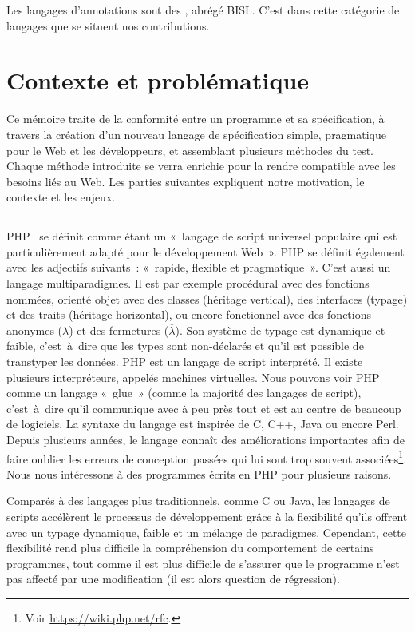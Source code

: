 Les langages d'annotations sont des , abré\-gé BISL. C'est dans cette catégorie de langages
que se situent nos contributions.

\section{Contexte et problématique}

Ce mémoire traite de la conformité entre un programme et sa spécification, à
travers la création d'un nouveau langage de spécification simple, pragmatique
pour le Web et les développeurs, et assemblant plusieurs méthodes du test.
Chaque méthode introduite se verra enrichie pour la rendre compatible avec les
besoins liés au Web. Les parties suivantes expliquent notre motivation, le
contexte et les enjeux.

\subsection{}

PHP~ se définit comme étant un «~langage de script universel
populaire qui est particulièrement adapté pour le développement Web~». PHP se
définit également avec les adjectifs suivants~: «~rapide, flexible et
pragmatique~». C'est aussi un langage multiparadigmes. Il est par exemple
procédural avec des fonctions nommées, orienté objet avec des classes (héritage
vertical), des interfaces (typage) et des traits (héritage horizontal), ou
encore fonctionnel avec des fonctions anonymes ($\lambda$) et des fermetures
($\overline{\lambda}$). Son système de typage est dynamique et faible,
c'est~à~dire que les types sont non-déclarés et qu'il est possible de transtyper
les données. PHP est un langage de script interprété. Il existe plusieurs
interpréteurs, appelés machines virtuelles. Nous pouvons voir PHP comme un
langage «~glue~» (comme la majorité des langages de script), c'est~à~dire qu'il
communique avec à peu près tout et est au centre de beaucoup de logiciels. La
syntaxe du langage est inspirée de C, C++, Java ou encore Perl. Depuis
plusieurs années, le langage connaît des améliorations importantes afin de faire
oublier les erreurs de conception passées qui lui sont trop souvent
associées\footnote{Voir \url{https://wiki.php.net/rfc}.}. Nous nous intéressons
à des programmes écrits en PHP pour plusieurs raisons.

Comparés à des langages plus traditionnels, comme C ou Java, les langages de
scripts accélèrent le processus de développement grâce à la flexibilité qu'ils
offrent avec un typage dynamique, faible et un mélange de paradigmes. Cependant,
cette flexibilité rend plus difficile la compréhension du comportement de
certains programmes, tout comme il est plus difficile de s'assurer que le
programme n'est pas affecté par une modification (il est alors question de
régression).

